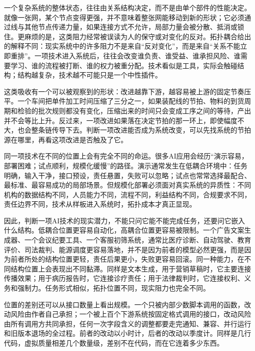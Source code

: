 一个复杂系统的整体状态，往往由关系结构决定，而不是由单个部件的性能决定\cite{boccaletti2006complex}。就像一张网，某个节点变得更强，并不意味着整张网能移动到新的形状；它必须通过线与其他节点传递力量，如果连接方式不允许，局部力量会被分散、抵消或锁住。更麻烦的是，这类阻力经常被误读为人的保守或对变化的反对。拓扑耦合给出的解释不同：现实系统中的许多阻力不是来自“反对变化”，而是来自“关系不能立即重排”。一项技术进入系统后，往往会改变谁负责、谁受益、谁承担风险、谁需要学习、谁的流程被打断、谁的权力被重分配。技术看似是工具，实际会触碰结构；结构越复杂，技术越不可能只是一个中性插件。

这类吸收有一个可以被观察到的形状：改进越靠下游，越容易被上游的固定节奏压平。一个车间把单件加工时间压缩了三分之一，如果装配线的节拍、物料的到货周期和检验的批次规则都没有变化，压缩出来的时间只会变成工序之间的等待，产出并不会等比上升。反过来，一项改进如果落在决定节拍的那一环上，即使幅度不大，也会整条链传导下去。判断一项改进能否成为系统改变，可以先找系统的节拍源在哪里，再看这项改进是否触及了它。


同一项技术在不同的位置上会有完全不同的命运。很多AI应用会经历“演示容易，部署困难；试点顺利，规模化缓慢”的路径。演示通常发生在低耦合环境中：任务明确，输入干净，接口预设，责任悬置，失败可以忽略；试点也常常选择最配合、最标准、最容易成功的局部场景。但规模化部署必须面对真实系统的异质性：不同机构的数据结构不同，人员能力不同，流程不同，利益结构不同，合规要求不同，责任边界不同，技术从样板进入系统时，拓扑成本才真正显现。

因此，判断一项AI技术的现实潜力，不能只问它能不能完成任务，还要问它嵌入什么结构。低耦合位置更容易自动化，高耦合位置更容易被限制。一个广告文案生成器、一个会议纪要工具、一个客服初筛系统，通常比医疗诊断、自动驾驶、教育评价、司法裁判、能源调度更容易落地，并不是因为前者的模型必然更强，而是因为前者所处的结构位置更轻，责任后果更小，失败更容易回滚。同一种能力，在不同结构位置上会表现出不同黏滞。同样是文本生成，用于营销草稿时，它主要连接传播效果；用于病历报告时，它连接诊疗责任；用于法律裁判时，它连接权利、义务和强制力。任务形式相似，拓扑位置不同，现实阻力也完全不同。

位置的差别还可以从接口数量上看出规模。一个只被内部少数脚本调用的函数，改动风险由作者自己承担；一个被上百个下游系统按固定格式调用的接口，改动风险由所有调用方共同承担，任何一次字段含义的调整都要走完通知、兼容、并行运行和旧版本退场的全过程。前者的改动以小时计，后者的改动以季度计。同样是几行代码，虚拟质量相差几个数量级，差别不在代码，而在它连着多少东西。

